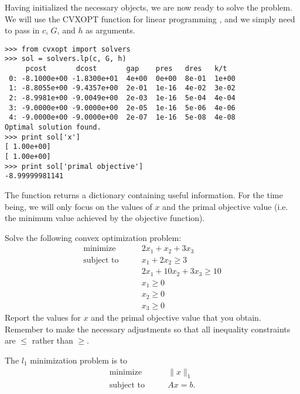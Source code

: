 Having initialized the necessary objects, we are now ready to solve the problem.
We will use the CVXOPT function for linear programming , and we simply need to pass in $c$, $G$, and $h$ as arguments.
\begin{lstlisting}
>>> from cvxopt import solvers
>>> sol = solvers.lp(c, G, h)
     pcost       dcost       gap    pres   dres   k/t
 0: -8.1000e+00 -1.8300e+01  4e+00  0e+00  8e-01  1e+00
 1: -8.8055e+00 -9.4357e+00  2e-01  1e-16  4e-02  3e-02
 2: -8.9981e+00 -9.0049e+00  2e-03  1e-16  5e-04  4e-04
 3: -9.0000e+00 -9.0000e+00  2e-05  1e-16  5e-06  4e-06
 4: -9.0000e+00 -9.0000e+00  2e-07  1e-16  5e-08  4e-08
Optimal solution found.
>>> print sol['x']
[ 1.00e+00]
[ 1.00e+00]
>>> print sol['primal objective']
-8.99999981141
\end{lstlisting}
The function  returns a dictionary containing useful information.
For the time being, we will only focus on the values of $x$ and the primal objective value (i.e. the minimum value achieved by
the objective function).
\begin{problem}
Solve the following convex optimization problem:
\begin{align*}
\text{minimize}\qquad &2x_1+x_2+3x_3 \\
\text{subject to}\qquad &x_1+2x_2 \geq 3 \\
	        &2x_1+10x_2+3x_3 \geq 10 \\
		&x_1 \geq 0 \\
		&x_2 \geq 0 \\
		&x_3 \geq 0
\end{align*}
Report the values for $x$ and the primal objective value that you obtain.
Remember to make the necessary adjustments so that all inequality constraints are $\leq$ rather than $\geq$.
\end{problem}

The $l_1$ minimization problem is to
\begin{align*}
\text{minimize}\qquad &\|x\|_1\\
\text{subject to} \qquad &Ax = b.
\end{align*}

